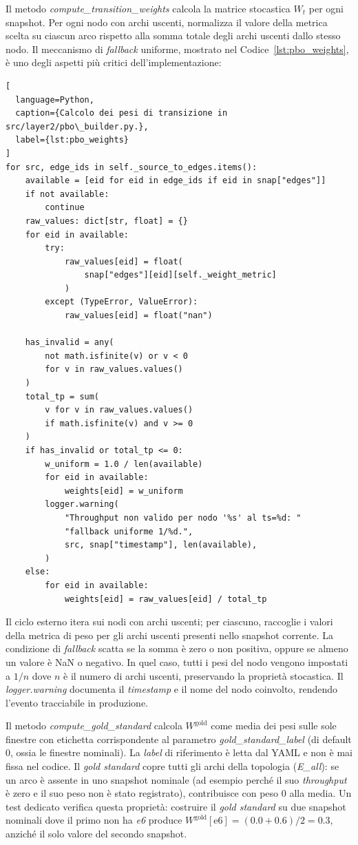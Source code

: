 Il metodo \textit{compute\_transition\_weights} calcola la matrice stocastica $W_t$ per ogni
snapshot. Per ogni nodo con archi uscenti, normalizza il valore della metrica scelta su ciascun
arco rispetto alla somma totale degli archi uscenti dallo stesso nodo. Il meccanismo di
\textit{fallback} uniforme, mostrato nel Codice~\ref{lst:pbo_weights}, è uno degli aspetti
più critici dell'implementazione:

\begin{lstlisting}[
  language=Python,
  caption={Calcolo dei pesi di transizione in src/layer2/pbo\_builder.py.},
  label={lst:pbo_weights}
]
for src, edge_ids in self._source_to_edges.items():
    available = [eid for eid in edge_ids if eid in snap["edges"]]
    if not available:
        continue
    raw_values: dict[str, float] = {}
    for eid in available:
        try:
            raw_values[eid] = float(
                snap["edges"][eid][self._weight_metric]
            )
        except (TypeError, ValueError):
            raw_values[eid] = float("nan")

    has_invalid = any(
        not math.isfinite(v) or v < 0
        for v in raw_values.values()
    )
    total_tp = sum(
        v for v in raw_values.values()
        if math.isfinite(v) and v >= 0
    )
    if has_invalid or total_tp <= 0:
        w_uniform = 1.0 / len(available)
        for eid in available:
            weights[eid] = w_uniform
        logger.warning(
            "Throughput non valido per nodo '%s' al ts=%d: "
            "fallback uniforme 1/%d.",
            src, snap["timestamp"], len(available),
        )
    else:
        for eid in available:
            weights[eid] = raw_values[eid] / total_tp
\end{lstlisting}

Il ciclo esterno itera sui nodi con archi uscenti; per ciascuno, raccoglie i valori della metrica
di peso per gli archi uscenti presenti nello snapshot corrente. La condizione di \textit{fallback}
scatta se la somma è zero o non positiva, oppure se almeno un valore è NaN o negativo. In quel
caso, tutti i pesi del nodo vengono impostati a $1/n$ dove $n$ è il numero di archi uscenti,
preservando la proprietà stocastica. Il \textit{logger.warning} documenta il \textit{timestamp}
e il nome del nodo coinvolto, rendendo l'evento tracciabile in produzione.

Il metodo \textit{compute\_gold\_standard} calcola $W^{\text{gold}}$ come media dei pesi sulle
sole finestre con etichetta corrispondente al parametro \textit{gold\_standard\_label} (di default
0, ossia le finestre nominali). La \textit{label} di riferimento è letta dal YAML e non è mai
fissa nel codice. Il \textit{gold standard} copre tutti gli archi della topologia
(\textit{E\_all}): se un arco è assente in uno snapshot nominale (ad esempio perché il suo
\textit{throughput} è zero e il suo peso non è stato registrato), contribuisce con peso 0 alla
media. Un test dedicato verifica questa proprietà: costruire il \textit{gold standard} su due
snapshot nominali dove il primo non ha \textit{e6} produce
$W^{\text{gold}}[\text{e6}] = (0.0 + 0.6) / 2 = 0.3$, anziché il solo valore del secondo snapshot.

